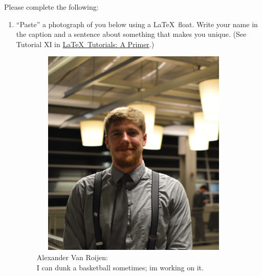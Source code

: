 \documentclass[12pt]{article}
\begin{document}
Please complete the following:
\begin{enumerate}
\item ``Paste'' a photograph of you below using a \LaTeX\ float.  Write your name in the caption and a sentence about something that makes you unique.  (See Tutorial XI in \href{https://www.tug.org/twg/mactex/tutorials/ltxprimer-1.0.pdf}{\LaTeX\ Tutorials: A Primer}.) \\

\begin{figure}[H]
\centering
\includegraphics[width=10cm,height=10cm]{cropped.jpg}
\caption[Alexander Van Roijen]{Alexander Van Roijen: \\I can dunk a basketball sometimes; im working on it.}
\label{alexV}
\end{figure}


\end{enumerate}
\end{document}
